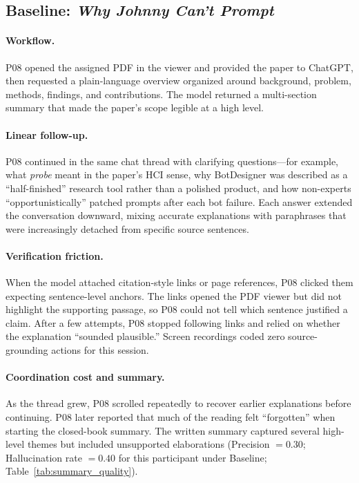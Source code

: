 \documentclass[manuscript,review,anonymous]{acmart}
\begin{document}
\subsection{Baseline: \textit{Why Johnny Can't Prompt}}

\paragraph{Workflow.}
P08 opened the assigned PDF in the viewer and provided the paper to ChatGPT, then requested a plain-language overview organized around background, problem, methods, findings, and contributions. The model returned a multi-section summary that made the paper's scope legible at a high level.

\paragraph{Linear follow-up.}
P08 continued in the same chat thread with clarifying questions---for example, what \textit{probe} meant in the paper's HCI sense, why BotDesigner was described as a ``half-finished'' research tool rather than a polished product, and how non-experts ``opportunistically'' patched prompts after each bot failure. Each answer extended the conversation downward, mixing accurate explanations with paraphrases that were increasingly detached from specific source sentences.

\paragraph{Verification friction.}
When the model attached citation-style links or page references, P08 clicked them expecting sentence-level anchors. The links opened the PDF viewer but did not highlight the supporting passage, so P08 could not tell which sentence justified a claim. After a few attempts, P08 stopped following links and relied on whether the explanation ``sounded plausible.'' Screen recordings coded zero source-grounding actions for this session.

\paragraph{Coordination cost and summary.}
As the thread grew, P08 scrolled repeatedly to recover earlier explanations before continuing. P08 later reported that much of the reading felt ``forgotten'' when starting the closed-book summary. The written summary captured several high-level themes but included unsupported elaborations (Precision $=0.30$; Hallucination rate $=0.40$ for this participant under Baseline; Table~\ref{tab:summary_quality}).
\end{document}
